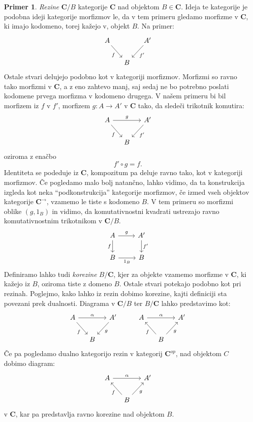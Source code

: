\documentclass[12pt,a4paper]{book}
\theoremstyle{definition}
\theoremstyle{plain}
\theoremstyle{definition}
\newtheorem{primer}{Primer}[section]
\theoremstyle{remark}
\newcommand{\cat}[1]{\textbf{#1}}
\begin{document}
\begin{primer}
\emph{Rezine} $\cat{C}/B$ kategorije $\cat{C}$ nad objektom $B \in \cat{C}$. Ideja te kategorije je podobna ideji kategorije morfizmov le, da v tem primeru gledamo morfizme v $\cat{C}$, ki imajo kodomeno, torej kažejo v, objekt $B$. Na primer:
%
\[ \begin{tikzcd}[column sep=small]
A \arrow[rd, "f"'] & & \arrow[ld, "f'"] A' \\
& B &
\end{tikzcd} \]
%
Ostale stvari delujejo podobno kot v kategoriji morfizmov. Morfizmi so ravno tako morfizmi v $\cat{C}$, a z eno zahtevo manj, saj sedaj ne bo potrebno poslati kodomene prvega morfizma v kodomeno drugega. V našem primeru bi bil morfizem iz $f$ v $f'$, morfizem $g : A \to A'$ v $\cat{C}$ tako, da sledeči trikotnik komutira:
%
\[ \begin{tikzcd}[column sep=small]
A \arrow[rd, "f"'] \ar[rr, "g"] & & \arrow[ld, "f'"] A' \\
& B &
\end{tikzcd} \]
oziroma z enačbo
$$f' \circ g = f.$$
Identiteta se podeduje iz $\cat{C}$, kompozitum pa deluje ravno tako, kot v kategoriji morfizmov. Če pogledamo malo bolj natančno, lahko vidimo, da ta konstrukcija izgleda kot neka "`podkonstrukcija"' kategorije morfizmov, če izmed vseh objektov kategorije $\cat{C}^{\rightarrow}$, vzamemo le tiste s kodomeno $B$. V tem primeru so morfizmi oblike $(g, 1_B)$ in vidimo, da komutativnostni kvadrati ustrezajo ravno komutativnostnim trikotnikom v $\cat{C}/B$.
%
\[ \begin{tikzcd}
A \ar[d, "f"'] \ar[r, "g"] & A' \ar[d, "f'"] \\
B \ar[r, "1_B"'] & B
\end{tikzcd} \]
%
Definiramo lahko tudi \emph{korezine} $B/\cat{C}$, kjer za objekte vzamemo morfizme v $\cat{C}$, ki kažejo iz $B$, oziroma tiste z domeno $B$. Ostale stvari potekajo podobno kot pri rezinah.
Poglejmo, kako lahko iz rezin dobimo korezine, kajti definiciji sta povezani prek dualnosti.
Diagrama v $\cat{C}/B$ ter $B/\cat{C}$ lahko predstavimo kot:
$$\begin{tikzcd}[column sep=small]
A \ar[dr, "f"'] \ar[rr, "\alpha"] & &  A' \ar[dl, "g"] & & A \ar[rr, "\alpha"] && A' \\
& B &  & & & B \ar[ul, "f"] \ar[ur, "g"'] &
\end{tikzcd}$$
Če pa pogledamo dualno kategorijo rezin v kategorij $\cat{C}^{op}$, nad objektom $C$ dobimo diagram:
$$\begin{tikzcd}[column sep=small]
A \ar[rr, "\alpha"]&& A'  \\
& B \ar[ul, "f"] \ar[ur, "g"'] &
\end{tikzcd}$$
v $\cat{C}$, kar pa predstavlja ravno korezine nad objektom $B$.

\end{primer}
\end{document}
